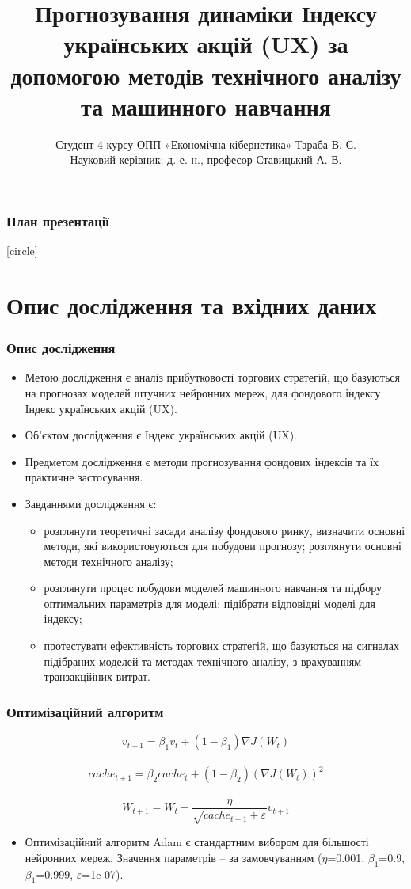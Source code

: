 \documentclass[aspectratio=169]{beamer}
\title{Прогнозування динаміки Індексу українських акцій (UX) за допомогою методів технічного аналізу та машинного навчання}
\author{Студент 4 курсу ОПП «Економічна кібернетика» Тараба В. С.\\ Науковий керівник: д. е. н., професор Ставицький А. В.}
\institute{Київський національний університет імені Тараса Шевченка\\Економічний факультет\\Кафедра економічної кібернетики}
\begin{document}
	
\begin{frame}
\titlepage
\end{frame}

\begin{frame}
\frametitle{План презентації}
[circle]
\tableofcontents
\end{frame}

\section{Опис дослідження та вхідних даних}

\begin{frame}
\frametitle{Опис дослідження}
\begin{itemize}
\item \alert {Метою дослідження}  є  аналіз  прибутковості  торгових  стратегій, що базуються  на  прогнозах  моделей  штучних  нейронних  мереж,  для  фондового індексу Індекс українських акцій (UX).
\tinyskip
\item \alert {Об’єктом дослідження} є Індекс українських акцій (UX).
\tinyskip
\item \alert {Предметом дослідження} є методи прогнозування фондових індексів та їх практичне застосування.
\tinyskip
\item \alert {Завданнями дослідження} є:
\begin{itemize}
    \item[\textcolor{orange}{\textbullet}] розглянути теоретичні засади аналізу фондового ринку, визначити основні методи, які використовуються для побудови прогнозу; розглянути основні методи технічного аналізу; 
    \item[\textcolor{orange}{\textbullet}] розглянути процес побудови  моделей машинного навчання та підбору оптимальних параметрів для моделі; підібрати відповідні моделі для індексу; 
    \item[\textcolor{orange}{\textbullet}] протестувати ефективність торгових стратегій, що базуються на сигналах підібраних  моделей та методах технічного аналізу, з врахуванням транзакційних витрат. 
\end{itemize}
\end{itemize}
\end{frame}

\begin{frame}
\frametitle{Оптимізаційний алгоритм}
\[ v_{t+1} = \beta_{1} v_{t} + (1-\beta_{1})\nabla J(W_{t}) \]\\
\[ cache_{t+1} = \beta_{2} cache_{t} + (1-\beta_{2})(\nabla J(W_{t}))^{2} \]\\
\[ W_{t+1} = W_{t}-\frac{\eta}{\sqrt{cache_{t+1}+\varepsilon}}v_{t+1} \]
\bigskip
\begin{itemize}
\item \alert {Оптимізаційний алгоритм Adam} є стандартним вибором для більшості нейронних мереж. Значення параметрів – за замовчуванням ($\eta$=0.001, $\beta_{1}$=0.9, $\beta_{1}$=0.999, $\varepsilon$=1e-07). 
\end{itemize}
\end{frame}
\end{document}
